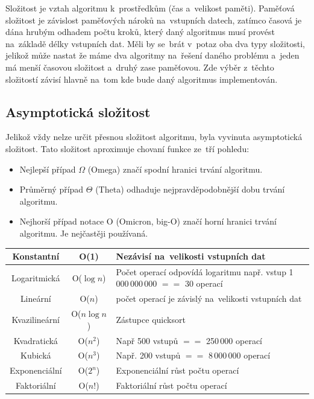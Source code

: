 Složitost je vztah algoritmu k~prostředkům (čas a~velikost paměti). Paměťová složitost je závislost paměťových nároků na~vstupních datech, zatímco časová je dána hrubým odhadem počtu kroků, který daný algoritmus musí provést na~základě délky vstupních dat. Měli by se~brát v~potaz oba dva typy složitosti, jelikož může nastat že máme dva algoritmy na~řešení daného problému a~jeden má menší časovou složitost a~druhý zase paměťovou. Zde výběr z~těchto složitostí závisí hlavně na~tom kde bude daný algoritmus implementován.

\subsection{Asymptotická složitost}

Jelikož vždy nelze určit přesnou složitost algoritmu, byla vyvinuta asymptotická složitost. Tato složitost aproximuje chovaní funkce ze~tří pohledu:

\begin{itemize}[noitemsep]
	\item Nejlepší případ $\Omega$ (Omega) značí spodní hranici trvání algoritmu.
	\item Průměrný případ $\Theta$ (Theta) odhaduje nejpravděpodobnější dobu trvání algoritmu.
	\item Nejhorší případ notace O (Omicron, big-O) značí horní hranici trvání algoritmu. Je nejčastěji používaná.
\end{itemize}

\begin{table}[h]
	\begin{tabularx}{\textwidth}{|c|c|X|}\hline
		Konstantní & O(1) & Nezávisí na~velikosti vstupních dat \\\hline
		Logaritmická & O($\log{n}$) & Počet operací odpovídá logaritmu např. vstup 1\,000\,000\,000 $==$ 30 operací \\\hline
		Lineární & O($n$)& počet operací je závislý na~velikosti vstupních dat \\\hline
		Kvazilineární& O($n\log{n}$)& Zástupce quicksort \\\hline
		Kvadratická& O($n^2$)& Např 500 vstupů $==$ 250\,000 operací \\\hline
		Kubická & O($n^3$)& Např. 200 vstupů $==$ 8\,000\,000 operací \\\hline
		Exponenciální&O($2^n$)& Exponenciální růst počtu operací \\\hline
		Faktoriální&O($n!$)& Faktoriální růst počtu operací \\\hline
	\end{tabularx}
\end{table}

